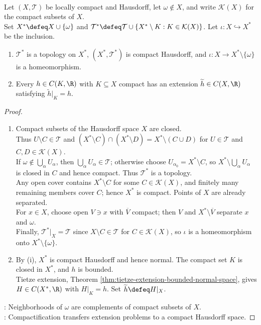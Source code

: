 \begin{proposition} \label{prop:alexandroff-one-point-compactification} \\
Let $(X,\mathcal{T})$ be locally compact and Hausdorff, let $\omega\notin X$, and write $\mathcal{K}(X)$ for the compact subsets of $X$.\\
Set $X^\ast\defeq X\cup\{\omega\}$ and $\mathcal{T}^\ast\defeq\mathcal{T}\cup\{X^\ast\setminus K:K\in\mathcal{K}(X)\}$. Let $\iota:X\hookrightarrow X^\ast$ be the inclusion.
\begin{enumerate}[label=(\roman*)]
\setlength{\itemsep}{0pt}
\item $\mathcal{T}^\ast$ is a topology on $X^\ast$, $(X^\ast,\mathcal{T}^\ast)$ is compact Hausdorff, and $\iota:X\to X^\ast\setminus\{\omega\}$ is a homeomorphism.
\item Every $h\in C(K,\R)$ with $K\subseteq X$ compact has an extension $\widetilde{h}\in C(X,\R)$ satisfying $\widetilde{h}|_K=h$.
\end{enumerate}
\begin{proof}
\begin{enumerate}[label=(\roman*)]
\setlength{\itemsep}{0pt}
\item[(i)] Compact subsets of the Hausdorff space $X$ are closed.\\
Thus $U\setminus C\in\mathcal{T}$ and $(X^\ast\setminus C)\cap(X^\ast\setminus D)=X^\ast\setminus(C\cup D)$ for $U\in\mathcal{T}$ and $C,D\in\mathcal{K}(X)$.\\
If $\omega\notin\bigcup_\alpha U_\alpha$, then $\bigcup_\alpha U_\alpha\in\mathcal{T}$; otherwise choose $U_{\alpha_0}=X^\ast\setminus C$, so $X^\ast\setminus\bigcup_\alpha U_\alpha$ is closed in $C$ and hence compact. Thus $\mathcal{T}^\ast$ is a topology.\\
Any open cover contains $X^\ast\setminus C$ for some $C\in\mathcal{K}(X)$, and finitely many remaining members cover $C$; hence $X^\ast$ is compact. Points of $X$ are already separated.\\
For $x\in X$, choose open $V\ni x$ with $\overline{V}$ compact; then $V$ and $X^\ast\setminus\overline{V}$ separate $x$ and $\omega$.\\
Finally, $\mathcal{T}^\ast|_X=\mathcal{T}$ since $X\setminus C\in\mathcal{T}$ for $C\in\mathcal{K}(X)$, so $\iota$ is a homeomorphism onto $X^\ast\setminus\{\omega\}$.
\item[(ii)] By (i), $X^\ast$ is compact Hausdorff and hence normal. The compact set $K$ is closed in $X^\ast$, and $h$ is bounded.\\
Tietze extension, Theorem \ref{thm:tietze-extension-bounded-normal-space}, gives $H\in C(X^\ast,\R)$ with $H|_K=h$. Set $\widetilde{h}\defeq H|_X$.
\end{enumerate}
: Neighborhoods of $\omega$ are complements of compact subsets of $X$.\\
: Compactification transfers extension problems to a compact Hausdorff space.
\end{proof}
\end{proposition}

